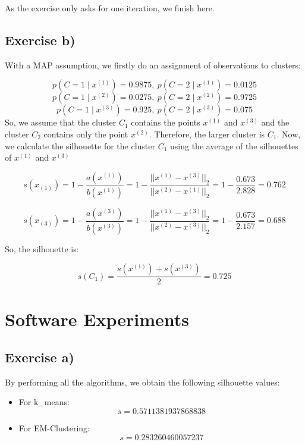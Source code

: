 \documentclass{article}
\begin{document}
As the exercise only asks for one iteration, we finish here.

\newpage
\subsection{Exercise b)}

With a MAP assumption, we firstly do an assignment of observations to clusters:

\[
p(C = 1 \mid x^{(1)}) = 0.9875, \: p(C = 2 \mid x^{(1)}) = 0.0125
\]
\[
p(C = 1 \mid x^{(2)}) = 0.0275, \: p(C = 2 \mid x^{(2)}) = 0.9725
\]
\[
p(C = 1 \mid x^{(3)}) = 0.925, \: p(C = 2 \mid x^{(3)}) = 0.075
\]
\newline
So, we assume that the cluster \(C_1\) contains the points \(x^{(1)}\) and \(x^{(3)}\) and the cluster
\(C_2\) contains only the point \(x^{(2)}\). Therefore, the larger cluster is \(C_1\).
\newline
Now, we calculate the silhouette for the cluster \(C_1\) using the average of the silhouettes of \(x^{(1)}\) and \(x^{(3)}\)

\[
s(x_{(1)}) = 1 - \frac{a(x^{(1)})}{b(x^{(1)})} = 1 - \frac{{||x^{(1)} - x^{(3)}||}_2}{{||x^{(2)} - x^{(1)}||}_2} = 1 - \frac{0.673}{2.828} = 0.762
\]

\[
s(x_{(3)}) = 1 - \frac{a(x^{(3)})}{b(x^{(3)})} = 1 - \frac{{||x^{(1)} - x^{(3)}||}_2}{{||x^{(2)} - x^{(3)}||}_2} = 1 - \frac{0.673}{2.157} = 0.688
\]

So, the silhouette is:

\[
s(C_1) = \frac{s(x^{(1)}) + s(x^{(3)})}{2} = 0.725
\]

\newpage

\section{Software Experiments}
\subsection{Exercise a)}

By performing all the algorithms, we obtain the following silhouette values:

\begin{itemize}
    \item For k\_means: 
    \[ s = 0.5711381937868838 \]
    
    \item For EM-Clustering: 
    \[ s = 0.283260460057237\]
\end{itemize}
\end{document}
